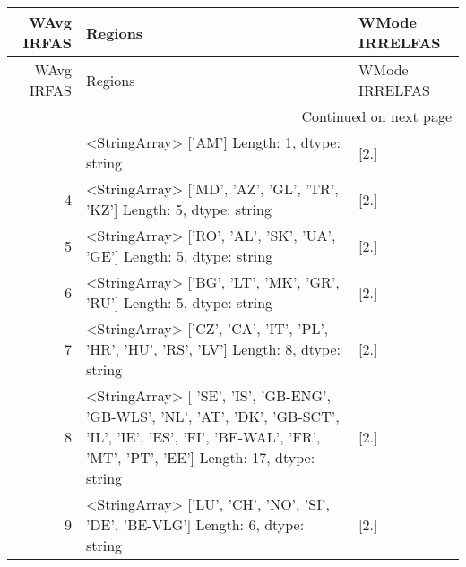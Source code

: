 \begin{longtable}{rll}
\label{tab:weighted_mode_I} \\
\toprule
WAvg IRFAS & Regions & WMode IRRELFAS \\
\midrule
\endfirsthead
\toprule
WAvg IRFAS & Regions & WMode IRRELFAS \\
\midrule
\endhead
\midrule
\multicolumn{3}{r}{Continued on next page} \\
\midrule
\endfoot
\bottomrule
\endlastfoot
3 & <StringArray>
['AM']
Length: 1, dtype: string & [2.] \\
4 & <StringArray>
['MD', 'AZ', 'GL', 'TR', 'KZ']
Length: 5, dtype: string & [2.] \\
5 & <StringArray>
['RO', 'AL', 'SK', 'UA', 'GE']
Length: 5, dtype: string & [2.] \\
6 & <StringArray>
['BG', 'LT', 'MK', 'GR', 'RU']
Length: 5, dtype: string & [2.] \\
7 & <StringArray>
['CZ', 'CA', 'IT', 'PL', 'HR', 'HU', 'RS', 'LV']
Length: 8, dtype: string & [2.] \\
8 & <StringArray>
[    'SE',     'IS', 'GB-ENG', 'GB-WLS',     'NL',     'AT',     'DK',
 'GB-SCT',     'IL',     'IE',     'ES',     'FI', 'BE-WAL',     'FR',
     'MT',     'PT',     'EE']
Length: 17, dtype: string & [2.] \\
9 & <StringArray>
['LU', 'CH', 'NO', 'SI', 'DE', 'BE-VLG']
Length: 6, dtype: string & [2.] \\
\end{longtable}

